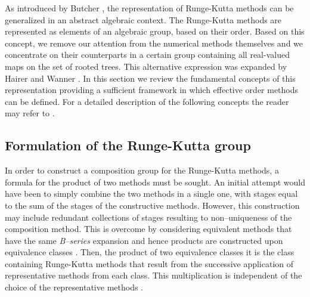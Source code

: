 \indent As introduced by Butcher \cite{Butcher1972}, the representation of Runge-Kutta methods can be generalized in an abstract algebraic context. The Runge-Kutta methods are represented as elements of an algebraic group, based on their order. Based on this concept, we remove our attention from the numerical methods themselves and we concentrate on their counterparts in a certain group containing all real-valued maps on the set of rooted trees. This alternative expression was expanded by Hairer and Wanner \cite{Hairer1974}. In this section we review the fundamental concepts of this representation providing a sufficient framework in which effective order methods can be defined. For a detailed description of the following concepts the reader may refer to \cite{Butcher2008_book}.


\subsection{Formulation of the Runge-Kutta group}\label{sec:RK_group}

\indent In order to construct a composition group for the Runge-Kutta methods, a formula for the product of two methods must be sought. An initial attempt would have been to simply combine the two methods in a single one, with stages equal to the sum of the stages of the constructive methods. However, this construction may include redundant collections of stages resulting to non--uniqueness of the composition method. This is overcome by considering equivalent methods that have the same \emph{B--series} expansion and hence products are constructed upon equivalence classes \cite{Butcher1987_book, Butcher2008_book}. Then, the product of two equivalence classes it is the class containing Runge-Kutta methods that result from the successive application of  representative methods from each class. This multiplication is independent of the choice of the representative methods \cite{Butcher2008_book}. 

